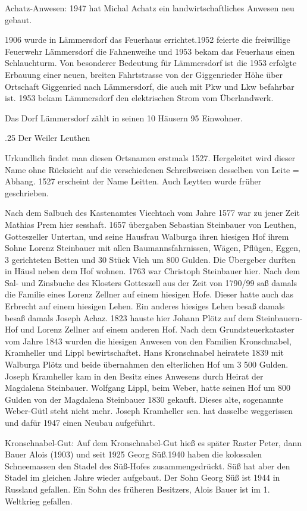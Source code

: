 Achatz-Anwesen: 1947 hat Michal Achatz ein landwirtschaftliches Anwesen neu
gebaut.

1906 wurde in Lämmersdorf das Feuerhaus errichtet.1952 feierte die freiwillige
Feuerwehr Lämmersdorf die Fahnenweihe und 1953 bekam das Feuerhaus einen
Schlauchturm. Von besonderer Bedeutung für Lämmersdorf ist die 1953 erfolgte
Erbauung einer neuen, breiten Fahrtstrasse von der Giggenrieder Höhe über
Ortschaft Giggenried nach Lämmersdorf, die auch mit Pkw und Lkw befahrbar ist.
1953 bekam Lämmersdorf den elektrischen Strom vom Überlandwerk.

Das Dorf Lämmersdorf zählt in seinen 10 Häusern 95 Einwohner.

.25 Der Weiler Leuthen

Urkundlich findet man diesen Ortsnamen erstmals 1527. Hergeleitet wird dieser
Name ohne Rücksicht auf die verschiedenen Schreibweisen desselben von Leite =
Abhang. 1527 erscheint der Name Leitten. Auch Leytten wurde früher geschrieben.

Nach dem Salbuch des Kastenamtes Viechtach vom Jahre 1577 war zu jener Zeit
Mathias Prem hier sesshaft. 1657 übergaben Sebastian Steinbauer von Leuthen,
Gotteszeller Untertan, und seine Hausfrau Walburga ihren hiesigen Hof ihrem
Sohne Lorenz Steinbauer mit allen Baumannsfahrnissen, Wägen, Pflügen, Eggen, 3
gerichteten Betten und 30 Stück Vieh um 800 Gulden. Die Übergeber durften in
Häusl neben dem Hof wohnen. 1763 war Christoph Steinbauer hier. Nach dem Sal-
und Zinsbuche des Klosters Gotteszell aus der Zeit von 1790/99 saß damals die
Familie eines Lorenz Zellner auf einem hiesigen Hofe. Dieser hatte auch das
Erbrecht auf einem hiesigen Lehen. Ein anderes hiesiges Lehen besaß damals besaß
damals Joseph Achaz. 1823 hauste hier Johann Plötz auf dem Steinbauern-Hof und
Lorenz Zellner auf einem anderen Hof. Nach dem Grundsteuerkataster vom Jahre
1843 wurden die hiesigen Anwesen von den Familien Kronschnabel, Kramheller und
Lippl bewirtschaftet. Hans Kronschnabel heiratete 1839 mit Walburga Plötz und
beide übernahmen den elterlichen Hof um 3 500 Gulden. Joseph Kramheller kam in
den Besitz eines Anwesens durch Heirat der Magdalena Steinbauer. Wolfgang Lippl,
beim Weber, hatte seinen Hof um 800 Gulden von der Magdalena Steinbauer 1830
gekauft. Dieses alte, sogenannte Weber-Gütl steht nicht mehr. Joseph Kramheller
sen. hat dasselbe weggerissen und dafür 1947 einen Neubau aufgeführt.

Kronschnabel-Gut: Auf dem Kronschnabel-Gut hieß es später Raster Peter, dann
Bauer Alois (1903) und seit 1925 Georg Süß.1940 haben die kolossalen
Schneemassen den Stadel des Süß-Hofes zusammengedrückt. Süß hat aber den Stadel
im gleichen Jahre wieder aufgebaut. Der Sohn Georg Süß ist 1944 in Russland
gefallen. Ein Sohn des früheren Besitzers, Alois Bauer ist im 1. Weltkrieg
gefallen.

